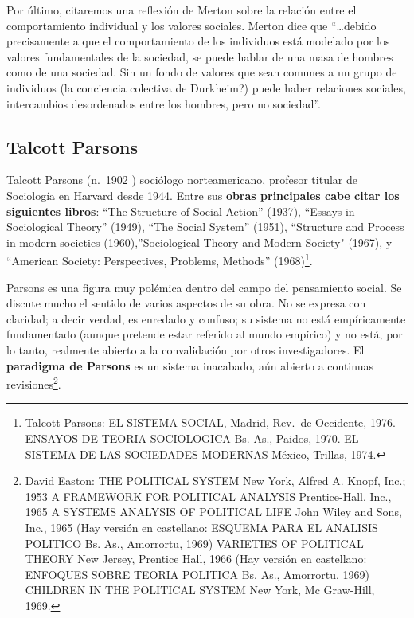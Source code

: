 \documentclass[
]{book}
\begin{document}
Por último, citaremos una reflexión de Merton sobre la relación entre el comportamiento individual y los valores sociales. Merton dice que ``\ldots debido precisamente a que el comportamiento de los individuos está modelado por los valores fundamentales de la sociedad, se puede hablar de una masa de hombres como de una sociedad. Sin un fondo de valores que sean comunes a un grupo de individuos (la conciencia colectiva de Durkheim?) puede haber relaciones sociales, intercambios desordenados entre los hombres, pero no sociedad''.

\hypertarget{talcott-parsons}{%
\subsection*{Talcott Parsons}\label{talcott-parsons}}

Talcott Parsons (n.~1902 ) sociólogo norteamericano, profesor titular de Sociología en Harvard desde 1944. Entre sus \textbf{obras principales cabe citar los siguientes libros}: ``The Structure of Social Action'' (1937), ``Essays in Sociological Theory'' (1949), ``The Social System'' (1951), ``Structure and Process in modern societies (1960),''Sociological Theory and Modern Society" (1967), y ``American Society: Perspectives, Problems, Methods'' (1968)\footnote{Talcott Parsons: EL SISTEMA SOCIAL, Madrid, Rev.~de Occidente, 1976.
  ENSAYOS DE TEORIA SOCIOLOGICA Bs. As., Paidos, 1970.
  EL SISTEMA DE LAS SOCIEDADES MODERNAS México, Trillas, 1974.}.

Parsons es una figura muy polémica dentro del campo del pensamiento social. Se discute mucho el sentido de varios aspectos de su obra. No se expresa con claridad; a decir verdad, es enredado y confuso; su sistema no está empíricamente fundamentado (aunque pretende estar referido al mundo empírico) y no está, por lo tanto, realmente abierto a la convalidación por otros investigadores. El \textbf{paradigma de Parsons} es un sistema inacabado, aún abierto a continuas revisiones\footnote{David Easton: THE POLITICAL SYSTEM New York, Alfred A. Knopf, Inc.; 1953 A FRAMEWORK FOR POLITICAL ANALYSIS Prentice-Hall, Inc., 1965 A SYSTEMS ANALYSIS OF POLITICAL LIFE John Wiley and Sons, Inc., 1965 (Hay versión en castellano: ESQUEMA PARA EL ANALISIS POLITICO Bs. As., Amorrortu, 1969) VARIETIES OF POLITICAL THEORY New Jersey, Prentice Hall, 1966 (Hay versión en castellano: ENFOQUES SOBRE TEORIA POLITICA Bs. As., Amorrortu, 1969) CHILDREN IN THE POLITICAL SYSTEM New York, Mc Graw-Hill, 1969.}.
\end{document}
